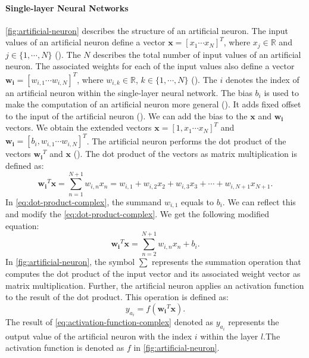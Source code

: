 \documentclass{BachelorBUI}
\begin{document}
            \paragraph{Single-layer Neural Networks}
            \label{par:single-layer-neural-networks}
                \autoref{fig:artificial-neuron} describes the structure of an artificial neuron. The input values of an artificial neuron define a vector $\mathbf{x} = [x_1 \cdots x_N]^T$, where $x_j \in \mathbb{R}$ and $j \in \{1, \cdots, N\}$ (\cite{Alpaydin:2014}). The $N$ describes the total number of input values of an artificial neuron. The associated weights for each of the input values also define a vector $\mathbf{w_i} = [w_{i,1} \cdots w_{i,N}]^T$, where $w_{i,k} \in \mathbb{R}$, $k \in \{1, \cdots, N\}$ (\cite{Alpaydin:2014}). The $i$ denotes the index of an artificial neuron within the single-layer neural network. The bias $b_i$ is used to make the computation of an artificial neuron more general (\cite{Alpaydin:2014}). It adds fixed offset to the input of the artificial neuron (\cite{Bishop:2024}). We can add the bias to the $\mathbf{x}$ and $\mathbf{w_i}$ vectors. We obtain the extended vectors $\mathbf{x} = [1, x_1 \cdots x_N]^T$ and $\mathbf{w_i} = [b_i, w_{i,1} \cdots w_{i,N}]^T$. The artificial neuron performs the dot product of the vectors $\mathbf{w_i}^T$ and $\mathbf{x}$ (\cite{Alpaydin:2014}). The dot product of the vectors as matrix multiplication is defined as:
                \begin{equation}
                    \mathbf{w_i}^T\mathbf{x} = \sum_{n=1}^{N+1} w_{i,n} x_n = w_{i,1} + w_{i,2}x_2 + w_{i,3}x_3 + \cdots + w_{i,N+1} x_{N+1}.
                    \label{eq:dot-product-complex}
                \end{equation}
                In \autoref{eq:dot-product-complex}, the summand $w_{i,1}$ equals to $b_i$. We can reflect this and modify the \autoref{eq:dot-product-complex}. We get the following modified equation:
                \begin{equation}
                    \mathbf{w_i}^T\mathbf{x} = \sum_{n=2}^{N+1} w_{i,n} x_n + b_i.
                    \label{eq:dot-product-complex-modified}
                \end{equation}
                In \autoref{fig:artificial-neuron}, the symbol $\sum$ represents the summation operation that computes the dot product of the input vector and its associated weight vector as matrix multiplication. Further, the artificial neuron applies an activation function to the result of the dot product. This operation is defined as:
                \begin{equation}
                    y_{a_{i}} = f(\mathbf{w_i}^T\mathbf{x}).
                    \label{eq:activation-function-complex}
                \end{equation}
                The result of \autoref{eq:activation-function-complex} denoted as $y_{a_{i}}$ represents the output value of the artificial neuron with the index $i$ within the layer $l$.The activation function is denoted as $f$ in \autoref{fig:artificial-neuron}.
\end{document}
